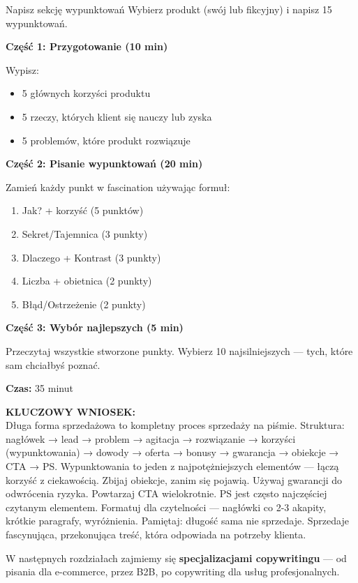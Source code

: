 \documentclass[
  12pt,
  a4paper,
  twoside,
  openright,
  12pt,
  DIV=12,
  BCOR=12mm]{scrbook}
\newcommand{\takeaway}[1]{%
  \begin{tcolorbox}[
    enhanced,
    colback=accentgreen!10,
    colframe=accentgreen,
    boxrule=0pt,
    borderline south={3pt}{0pt}{accentgreen},
    sharp corners,
    left=15pt, right=15pt, top=10pt, bottom=10pt
  ]
    \textbf{\color{accentgreen}KLUCZOWY WNIOSEK:}\\[5pt]
    #1
  \end{tcolorbox}
}
\begin{document}
\begin{cwiczenie}{Napisz sekcję wypunktowań}
Wybierz produkt (swój lub fikcyjny) i napisz 15 wypunktowań.

\textbf{Część 1: Przygotowanie (10 min)}

Wypisz:
\begin{itemize}
  \item 5 głównych korzyści produktu
  \item 5 rzeczy, których klient się nauczy lub zyska
  \item 5 problemów, które produkt rozwiązuje
\end{itemize}

\textbf{Część 2: Pisanie wypunktowań (20 min)}

Zamień każdy punkt w fascination używając formuł:
\begin{enumerate}
  \item Jak? + korzyść (5 punktów)
  \item Sekret/Tajemnica (3 punkty)
  \item Dlaczego + Kontrast (3 punkty)
  \item Liczba + obietnica (2 punkty)
  \item Błąd/Ostrzeżenie (2 punkty)
\end{enumerate}

\textbf{Część 3: Wybór najlepszych (5 min)}

Przeczytaj wszystkie stworzone punkty. Wybierz 10 najsilniejszych --- tych, które sam chciałbyś poznać.

\textbf{Czas:} 35 minut
\end{cwiczenie}

\takeaway{Długa forma sprzedażowa to kompletny proces sprzedaży na piśmie. Struktura: nagłówek → lead → problem → agitacja → rozwiązanie → korzyści (wypunktowania) → dowody → oferta → bonusy → gwarancja → obiekcje → CTA → PS. Wypunktowania to jeden z najpotężniejszych elementów --- łączą korzyść z ciekawością. Zbijaj obiekcje, zanim się pojawią. Używaj gwarancji do odwrócenia ryzyka. Powtarzaj CTA wielokrotnie. PS jest często najczęściej czytanym elementem. Formatuj dla czytelności --- nagłówki co 2-3 akapity, krótkie paragrafy, wyróżnienia. Pamiętaj: długość sama nie sprzedaje. Sprzedaje fascynująca, przekonująca treść, która odpowiada na potrzeby klienta.}

W następnych rozdziałach zajmiemy się \textbf{specjalizacjami
copywritingu} --- od pisania dla e-commerce, przez B2B, po copywriting
dla usług profesjonalnych.
\end{document}
